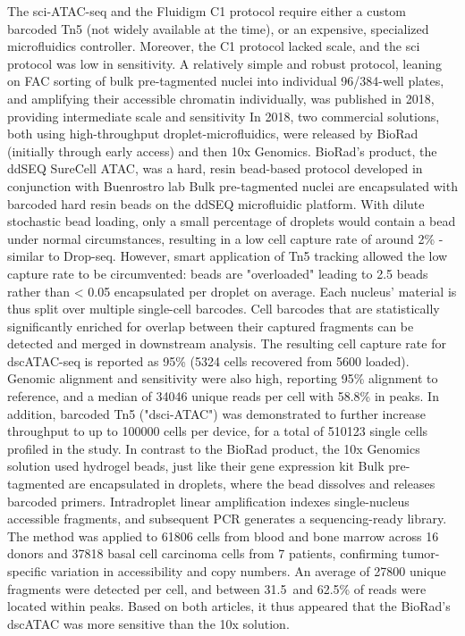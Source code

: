 The sci-ATAC-seq and the Fluidigm C1 protocol require either a custom barcoded Tn5 (not widely available at the time), or an expensive, specialized microfluidics controller. Moreover, the C1 protocol lacked scale, and the sci protocol was low in sensitivity. A relatively simple and robust protocol, leaning on FAC sorting of bulk pre-tagmented nuclei into individual 96/384-well plates, and amplifying their accessible chromatin individually, was published in 2018, providing intermediate scale and sensitivity In 2018, two commercial solutions, both using high-throughput droplet-microfluidics, were released by BioRad (initially through early access) and then 10x Genomics. BioRad's product, the ddSEQ SureCell ATAC, was a hard, resin bead-based protocol developed in conjunction with Buenrostro lab Bulk pre-tagmented nuclei are encapsulated with barcoded hard resin beads on the ddSEQ microfluidic platform. With dilute stochastic bead loading, only a small percentage of droplets would contain a bead under normal circumstances, resulting in a low cell capture rate of around 2\% - similar to Drop-seq. However, smart application of Tn5 tracking allowed the low capture rate to be circumvented: beads are "overloaded"\llap{,} leading to 2.5 beads rather than < 0.05 encapsulated per droplet on average. Each nucleus' material is thus split over multiple single-cell barcodes. Cell barcodes that are statistically significantly enriched for overlap between their captured fragments can be detected and merged in downstream analysis. The resulting cell capture rate for dscATAC-seq is reported as 95\% (\num{5324} cells recovered from \num{5600} loaded). Genomic alignment and sensitivity were also high, reporting 95\% alignment to reference, and a median of \num{34046} unique reads per cell with \num{58.8}\% in peaks. In addition, barcoded Tn5 ("dsci-ATAC") was demonstrated to further increase throughput to up to \num{100000} cells per device, for a total of \num{510123} single cells profiled in the study. In contrast to the BioRad product, the 10x Genomics solution used hydrogel beads, just like their gene expression kit Bulk pre-tagmented are encapsulated in droplets, where the bead dissolves and releases barcoded primers. Intradroplet linear amplification indexes single-nucleus accessible fragments, and subsequent PCR generates a sequencing-ready library. The method was applied to \num{61806} cells from blood and bone marrow across 16 donors and \num{37818} basal cell carcinoma cells from 7 patients, confirming tumor-specific variation in accessibility and copy numbers. An average of \num{27800} unique fragments were detected per cell, and between 31.5\ and 62.5\% of reads were located within peaks. Based on both articles, it thus appeared that the BioRad's dscATAC was more sensitive than the 10x solution.

